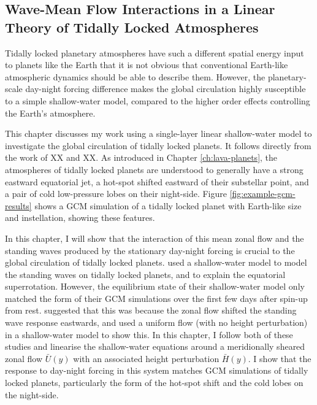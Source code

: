 \begin{SingleSpace}
\chapter{Wave-Mean Flow Interactions in a Linear Theory of Tidally Locked Atmospheres}\label{ch:wave-mean-flow}
\vspace{0.5cm}
\end{SingleSpace}
\vspace{0.5cm}


Tidally locked planetary atmospheres have such a different spatial energy input to planets like the Earth that it is not obvious that conventional Earth-like atmospheric dynamics should be able to describe them. However, the planetary-scale day-night forcing difference makes the global circulation highly susceptible to a simple shallow-water model, compared to the higher order effects controlling the Earth's atmosphere.

This chapter discusses my work using a single-layer linear shallow-water model to investigate the global circulation of tidally locked planets. It follows directly from the work of XX and XX. As introduced in Chapter \ref{ch:lava-planets}, the atmospheres of tidally locked planets are understood to generally have a strong eastward equatorial jet, a hot-spot shifted eastward of their substellar point, and a pair of cold low-pressure lobes on their night-side. Figure \ref{fig:example-gcm-results} shows a GCM simulation of a tidally locked planet with Earth-like size and instellation, showing these features.

In this chapter, I will show that the interaction of this mean zonal flow and the standing waves produced by the stationary day-night forcing is crucial to the global circulation of tidally locked planets. \citet{showman2011superrotation} used a shallow-water model to model the standing waves on tidally locked planets, and to explain the equatorial superrotation. However, the equilibrium state of their shallow-water model only matched the form of their GCM simulations over the first few days after spin-up from rest. \citet{tsai2014three} suggested that this was because the zonal flow shifted the standing wave response eastwards, and used a uniform flow (with no height perturbation) in a shallow-water model to show this. In this chapter, I follow both of these studies and linearise the shallow-water equations around a meridionally sheared zonal flow $\bar{U}(y)$ with an associated height perturbation $\bar{H}(y)$. I show that the response to day-night forcing in this system matches GCM simulations of tidally locked planets, particularly the form of the hot-spot shift and the cold lobes on the night-side.

